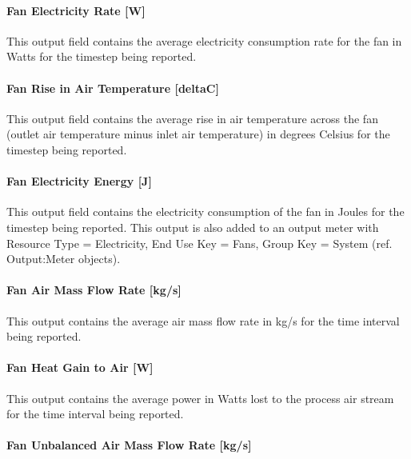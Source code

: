 \paragraph{Fan Electricity Rate {[}W{]}}\label{fan-electric-power-w-3}

This output field contains the average electricity consumption rate for the fan in Watts for the timestep being reported.

\paragraph{Fan Rise in Air Temperature {[}deltaC{]}}\label{fan-rise-in-air-temperature-deltac-3}

This output field contains the average rise in air temperature across the fan (outlet air temperature minus inlet air temperature) in degrees Celsius for the timestep being reported.

\paragraph{Fan Electricity Energy {[}J{]}}\label{fan-electric-energy-j-3}

This output field contains the electricity consumption of the fan in Joules for the timestep being reported. This output is also added to an output meter with Resource Type = Electricity, End Use Key = Fans, Group Key = System (ref. Output:Meter objects).

\paragraph{Fan Air Mass Flow Rate {[}kg/s{]}}\label{fan-air-mass-flow-kgs-3}

This output contains the average air mass flow rate in kg/s for the time interval being reported.

\paragraph{Fan Heat Gain to Air {[}W{]}}\label{fan-heat-gain-to-air-w-3}

This output contains the average power in Watts lost to the process air stream for the time interval being reported.

\paragraph{Fan Unbalanced Air Mass Flow Rate {[}kg/s{]}}\label{fan-unbalanced-air-mass-flow-rate-kgs}

